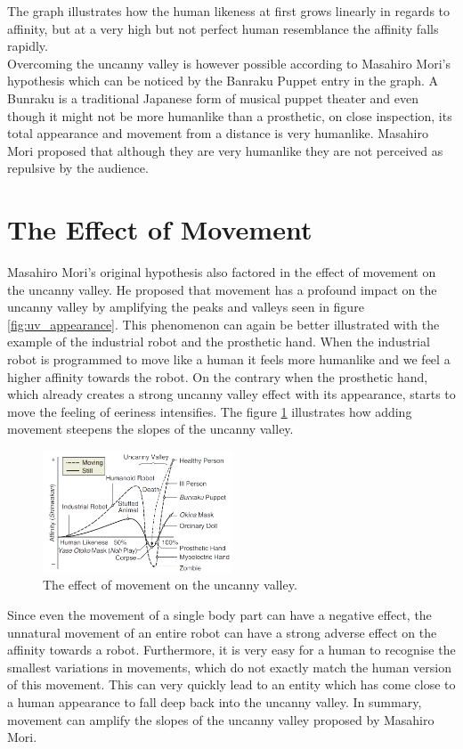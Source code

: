 The graph illustrates how the human likeness at first grows linearly in regards to affinity, but at a very high but not perfect human resemblance the affinity falls rapidly.\\ 
Overcoming the uncanny valley is however possible according to Masahiro Mori's hypothesis which can be noticed by the Banraku Puppet entry in the graph. A Bunraku is a traditional Japanese form of musical puppet theater and even though it might not be more humanlike than a prosthetic, on close inspection, its total appearance and movement from a distance is very humanlike. Masahiro Mori proposed that although they are very humanlike they are not perceived as repulsive by the audience.

\section{The Effect of Movement}
Masahiro Mori's original hypothesis \cite{original_masahiro} also factored in the effect of movement on the uncanny valley. He proposed that movement has a profound impact on the uncanny valley by amplifying the peaks and valleys seen in figure \ref{fig:uv_appearance}. This phenomenon can again be better illustrated with the example of the industrial robot and the prosthetic hand. When the industrial robot is programmed to move like a human it feels more humanlike and we feel a higher affinity towards the robot. On the contrary when the prosthetic hand, which already creates a strong uncanny valley effect with its appearance, starts to move the feeling of eeriness intensifies.
The figure \ref{fig:uv_movement} illustrates how adding movement steepens the slopes of the uncanny valley.
\begin{figure} %
    \centering
    \includegraphics[width=0.5\textwidth]{graphics/uv_movement.png}
    \caption{The effect of movement on the uncanny valley.}
    \label{fig:uv_movement}
\end{figure}
Since even the movement of a single body part can have a negative effect, the unnatural movement of an entire robot can have a strong adverse effect on the affinity towards a robot. Furthermore, it is very easy for a human to recognise the smallest variations in movements, which do not exactly match the human version of this movement. This can very quickly lead to an entity which has come close to a human appearance to fall deep back into the uncanny valley. In summary, movement can amplify the slopes of the uncanny valley proposed by Masahiro Mori.
